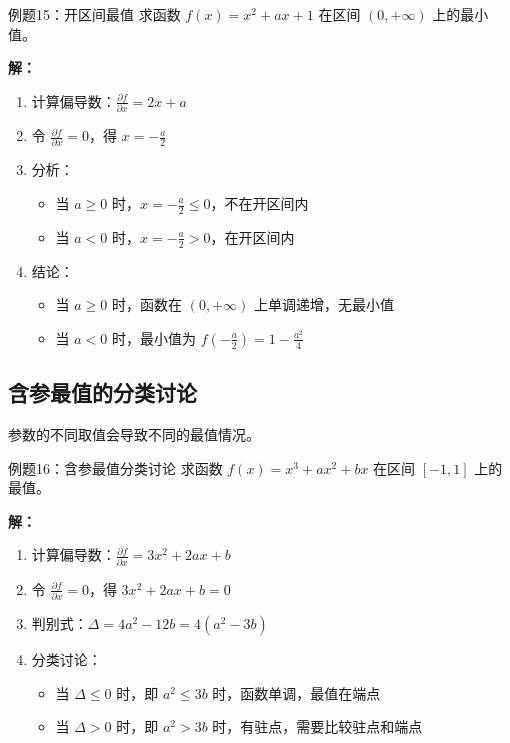 \documentclass[a4paper,11pt]{ctexart}
\newcommand{\partialder}[2]{\frac{\partial #1}{\partial #2}}
\theoremstyle{definition}
\theoremstyle{remark}
\begin{document}
\begin{examplebox}{例题15：开区间最值}
求函数 $f(x) = x^2 + ax + 1$ 在区间 $(0,+\infty)$ 上的最小值。

\textbf{解：}
\begin{enumerate}
    \item 计算偏导数：$\partialder{f}{x} = 2x + a$
    \item 令 $\partialder{f}{x} = 0$，得 $x = -\frac{a}{2}$
    \item 分析：
    \begin{itemize}
        \item 当 $a \geq 0$ 时，$x = -\frac{a}{2} \leq 0$，不在开区间内
        \item 当 $a < 0$ 时，$x = -\frac{a}{2} > 0$，在开区间内
    \end{itemize}
    \item 结论：
    \begin{itemize}
        \item 当 $a \geq 0$ 时，函数在 $(0,+\infty)$ 上单调递增，无最小值
        \item 当 $a < 0$ 时，最小值为 $f(-\frac{a}{2}) = 1 - \frac{a^2}{4}$
    \end{itemize}
\end{enumerate}
\end{examplebox}

\subsection{含参最值的分类讨论}

参数的不同取值会导致不同的最值情况。

\begin{examplebox}{例题16：含参最值分类讨论}
求函数 $f(x) = x^3 + ax^2 + bx$ 在区间 $[-1,1]$ 上的最值。

\textbf{解：}
\begin{enumerate}
    \item 计算偏导数：$\partialder{f}{x} = 3x^2 + 2ax + b$
    \item 令 $\partialder{f}{x} = 0$，得 $3x^2 + 2ax + b = 0$
    \item 判别式：$\Delta = 4a^2 - 12b = 4(a^2 - 3b)$
    \item 分类讨论：
    \begin{itemize}
        \item 当 $\Delta \leq 0$ 时，即 $a^2 \leq 3b$ 时，函数单调，最值在端点
        \item 当 $\Delta > 0$ 时，即 $a^2 > 3b$ 时，有驻点，需要比较驻点和端点
    \end{itemize}
\end{enumerate}
\end{examplebox}
\end{document}
